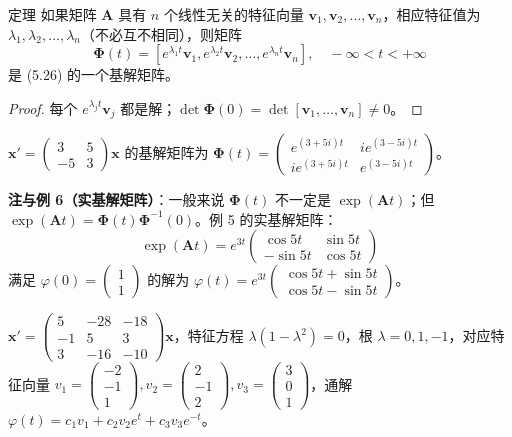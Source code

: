 \begin{myTheorem}{定理}
如果矩阵 $\mathbf{A}$ 具有 $n$ 个线性无关的特征向量 $\mathbf{v}_1, \mathbf{v}_2, \ldots, \mathbf{v}_n$，相应特征值为 $\lambda_1, \lambda_2, \ldots, \lambda_n$（不必互不相同），则矩阵
$$\boldsymbol{\Phi}(t) = [e^{\lambda_1 t}\mathbf{v}_1, e^{\lambda_2 t}\mathbf{v}_2, \ldots, e^{\lambda_n t}\mathbf{v}_n], \quad -\infty < t < +\infty$$
是 (5.26) 的一个基解矩阵。
\end{myTheorem}

\begin{proof}
每个 $e^{\lambda_j t}\mathbf{v}_j$ 都是解；$\det\boldsymbol{\Phi}(0) = \det[\mathbf{v}_1, \ldots, \mathbf{v}_n] \neq 0$。
\end{proof}

\begin{example}
$\mathbf{x}' = \begin{pmatrix} 3 & 5 \\ -5 & 3 \end{pmatrix}\mathbf{x}$ 的基解矩阵为 $\boldsymbol{\Phi}(t) = \begin{pmatrix} e^{(3+5i)t} & ie^{(3-5i)t} \\ ie^{(3+5i)t} & e^{(3-5i)t} \end{pmatrix}$。
\end{example}

\textbf{注与例 6（实基解矩阵）}：一般来说 $\boldsymbol{\Phi}(t)$ 不一定是 $\exp(\mathbf{A}t)$；但 $\exp(\mathbf{A}t) = \boldsymbol{\Phi}(t)\boldsymbol{\Phi}^{-1}(0)$。例 5 的实基解矩阵：
$$\exp(\mathbf{A}t) = e^{3t}\begin{pmatrix} \cos 5t & \sin 5t \\ -\sin 5t & \cos 5t \end{pmatrix}$$
满足 $\varphi(0) = \begin{pmatrix}1\\1\end{pmatrix}$ 的解为 $\varphi(t) = e^{3t}\begin{pmatrix}\cos 5t + \sin 5t \\ \cos 5t - \sin 5t\end{pmatrix}$。

\begin{example}
$\mathbf{x}' = \begin{pmatrix} 5 & -28 & -18 \\ -1 & 5 & 3 \\ 3 & -16 & -10 \end{pmatrix}\mathbf{x}$，特征方程 $\lambda(1-\lambda^2) = 0$，根 $\lambda = 0, 1, -1$，对应特征向量 $v_1 = \begin{pmatrix}-2\\-1\\1\end{pmatrix}, v_2 = \begin{pmatrix}2\\-1\\2\end{pmatrix}, v_3 = \begin{pmatrix}3\\0\\1\end{pmatrix}$，通解 $\varphi(t) = c_1v_1 + c_2v_2e^t + c_3v_3e^{-t}$。
\end{example}

